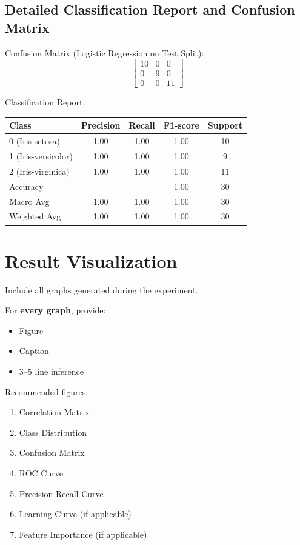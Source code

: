 \documentclass[12pt,a4paper]{article}
\begin{document}
\subsection*{Detailed Classification Report and Confusion Matrix}

Confusion Matrix (Logistic Regression on Test Split):
\begin{equation*}
\begin{bmatrix}
10 & 0 & 0 \\
0 & 9 & 0 \\
0 & 0 & 11
\end{bmatrix}
\end{equation*}

Classification Report:
\begin{tabular}{lcccc}
\toprule
Class & Precision & Recall & F1-score & Support \\
\midrule
0 (Iris-setosa) & 1.00 & 1.00 & 1.00 & 10 \\
1 (Iris-versicolor) & 1.00 & 1.00 & 1.00 & 9 \\
2 (Iris-virginica) & 1.00 & 1.00 & 1.00 & 11 \\
\midrule
Accuracy & & & 1.00 & 30 \\
Macro Avg & 1.00 & 1.00 & 1.00 & 30 \\
Weighted Avg & 1.00 & 1.00 & 1.00 & 30 \\
\bottomrule
\end{tabular}

\section{Result Visualization}

Include all graphs generated during the experiment.

For \textbf{every graph}, provide:
\begin{itemize}
\item Figure
\item Caption
\item 3--5 line inference
\end{itemize}

Recommended figures:
\begin{enumerate}
\item Correlation Matrix
\item Class Distribution
\item Confusion Matrix
\item ROC Curve
\item Precision-Recall Curve
\item Learning Curve (if applicable)
\item Feature Importance (if applicable)
\end{enumerate}
\end{document}
